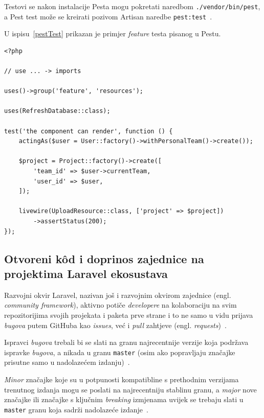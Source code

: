Testovi se nakon instalacije Pesta mogu pokretati naredbom \texttt{./vendor/bin/pest}, a Pest test može se kreirati pozivom Artisan naredbe \texttt{pest:test}~\cite{pestInstallation}.

U ispisu~\ref{pestTest} prikazan je primjer \textit{feature} testa pisanog u Pestu.

\begin{lstlisting}[caption={\texttt{UploadResourceTest} - \texttt{test 'the component can render'}}, label=pestTest]
<?php

// use ... -> imports

uses()->group('feature', 'resources');

uses(RefreshDatabase::class);

test('the component can render', function () {
    actingAs($user = User::factory()->withPersonalTeam()->create());

    $project = Project::factory()->create([
        'team_id' => $user->currentTeam,
        'user_id' => $user,
    ]);

    livewire(UploadResource::class, ['project' => $project])
        ->assertStatus(200);
});

\end{lstlisting}

\subsection{Otvoreni k\^od i doprinos zajednice na projektima Laravel ekosustava}
Razvojni okvir Laravel, nazivan još i razvojnim okvirom zajednice (engl. \textit{community framework}), aktivno potiče \textit{developere} na kolaboraciju na svim repozitorijima svojih projekata i paketa prve strane i to ne samo u vidu prijava \textit{bugova} putem GitHuba kao \textit{issues}, već i \textit{pull} zahtjeve (engl. \textit{requests})~\cite{contributions}.

Ispravci \textit{bugova} trebali bi se slati na granu najrecentnije verzije koja podržava ispravke \textit{bugova}, a nikada u granu \texttt{master} (osim ako popravljaju značajke prisutne samo u nadolazećem izdanju)~\cite{contributions}.

\textit{Minor} značajke koje su u potpunosti kompatibline s prethodnim verzijama trenutnog izdanja mogu se poslati na najrecentniju stablinu granu, a \textit{major} nove značajke ili značajke s ključnim \textit{breaking} izmjenama uvijek se trebaju slati u \texttt{master} granu koja sadrži nadolazeće izdanje~\cite{contributions}.

